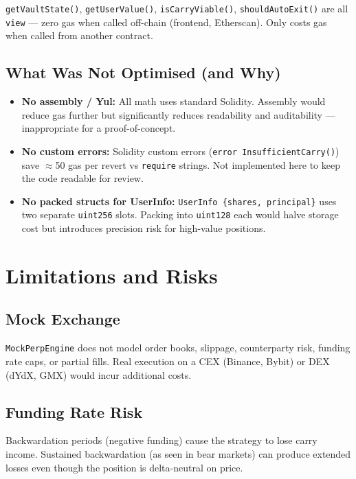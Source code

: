 \documentclass[11pt,a4paper]{article}
\begin{document}
\texttt{getVaultState()}, \texttt{getUserValue()}, \texttt{isCarryViable()}, \texttt{shouldAutoExit()} are all \texttt{view} --- zero gas when called off-chain (frontend, Etherscan). Only costs gas when called from another contract.

\subsection{What Was Not Optimised (and Why)}

\begin{itemize}
    \item \textbf{No assembly / Yul:} All math uses standard Solidity. Assembly would reduce gas further but significantly reduces readability and auditability --- inappropriate for a proof-of-concept.
    \item \textbf{No custom errors:} Solidity custom errors (\texttt{error InsufficientCarry()}) save $\approx$50 gas per revert vs \texttt{require} strings. Not implemented here to keep the code readable for review.
    \item \textbf{No packed structs for UserInfo:} \texttt{UserInfo \{shares, principal\}} uses two separate \texttt{uint256} slots. Packing into \texttt{uint128} each would halve storage cost but introduces precision risk for high-value positions.
\end{itemize}

\section{Limitations and Risks}

\subsection{Mock Exchange}
\texttt{MockPerpEngine} does not model order books, slippage, counterparty risk, funding rate caps, or partial fills. Real execution on a CEX (Binance, Bybit) or DEX (dYdX, GMX) would incur additional costs.

\subsection{Funding Rate Risk}
Backwardation periods (negative funding) cause the strategy to lose carry income. Sustained backwardation (as seen in bear markets) can produce extended losses even though the position is delta-neutral on price.
\end{document}
